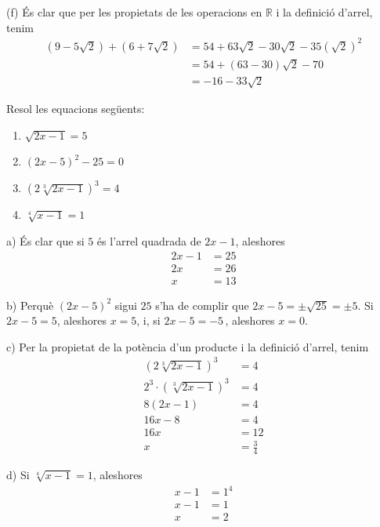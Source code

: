 \begin{solucio}
(f) És clar que per les propietats de les operacions en $\mathbb{R}$ i la
definició d’arrel, tenim%
\begin{align*}
\left( 9-5\sqrt{2}\right) +\left( 6+7\sqrt{2}\right) &=54+63\sqrt{2}-30%
\sqrt{2}-35\left( \sqrt{2}\right) ^{2} \\
&=54+(63-30)\sqrt{2}-70 \\
&=-16-33\sqrt{2}
\end{align*}
\end{solucio}

\begin{exercici}
Resol les equacions següents:

\begin{enumerate}
\item[a)] $\sqrt{2x-1}=5$

\item[b)] $(2x-5)^{2}-25=0$

\item[c)] $\left( 2\sqrt[3]{2x-1}\right) ^{3}=4$

\item[d)] $\sqrt[4]{x-1}=1$
\end{enumerate}

\end{exercici}

\begin{solucio}
a) És clar que si $5$ és l’arrel quadrada de \thinspace $2x-1$,
aleshores%
\begin{align*}
2x-1 &=25 \\
2x &=26 \\
x &=13
\end{align*}

b) Perquè $(2x-5)^{2}$ sigui $25$ s’ha de complir que $2x-5=\pm \sqrt{25}=\pm
5$. Si $2x-5=5$, aleshores $x=5$, i, si $2x-5=-5\,$, aleshores $x=0$.

c) Per la propietat de la potència d’un producte i la definició d’arrel, tenim%
\begin{align*}
\left( 2\sqrt[3]{2x-1}\right) ^{3} &=4 \\
2^{3}\cdot \left( \sqrt[3]{2x-1}\right) ^{3} &=4 \\
8(2x-1) &=4 \\
16x-8 &=4 \\
16x &=12 \\
x &=\frac{3}{4}
\end{align*}

d) Si $\sqrt[4]{x-1}=1$, aleshores%
\begin{align*}
x-1 &=1^{4} \\
x-1 &=1 \\
x &=2
\end{align*}
\end{solucio}

